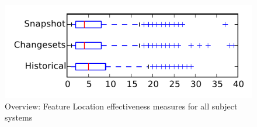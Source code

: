
\begin{figure}
\centering
\includegraphics[height=0.4\textheight]{figures/flt/all_tiny}
\caption{Overview: Feature Location effectiveness measures for all subject systems}
\label{fig:flt:all:tiny}
\end{figure}
